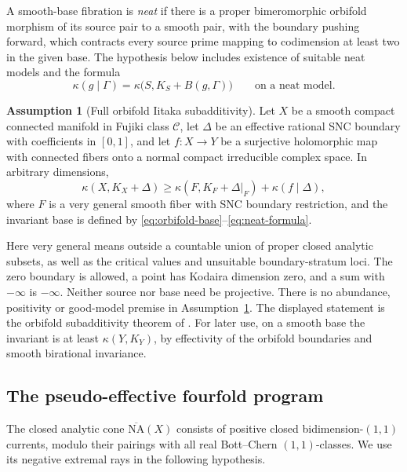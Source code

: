 \documentclass[11pt,letterpaper]{article}
\theoremstyle{definition}
\newtheorem{assumption}[theorem]{Assumption}
\theoremstyle{remark}
\begin{document}
A smooth-base fibration is \emph{neat} if there is a proper
bimeromorphic orbifold morphism of its source pair to a smooth pair,
with the boundary pushing forward, which contracts every source prime
mapping to codimension at least two in the given base. The hypothesis
below includes existence of suitable neat models and the formula
\begin{equation}\label{eq:neat-formula}
 \kappa(g\mid\Gamma)=\kappa\bigl(S,K_S+B(g,\Gamma)\bigr)
 \qquad\text{on a neat model}.
\end{equation}

\begin{assumption}[Full orbifold Iitaka subadditivity]
\label{hyp:campana}
Let \(X\) be a smooth compact connected manifold in Fujiki class
\(\mathcal C\), let \(\Delta\) be an effective rational SNC
boundary with coefficients in \([0,1]\), and let \(f:X\to Y\) be
a surjective holomorphic map with connected fibers onto a normal
compact irreducible complex space. In arbitrary dimensions,
\begin{equation}\label{eq:campana}
 \kappa(X,K_X+\Delta)\ge
 \kappa(F,K_F+\Delta|_F)+\kappa(f\mid\Delta),
\end{equation}
where \(F\) is a very general smooth fiber with SNC boundary
restriction, and the invariant base is defined by
\eqref{eq:orbifold-base}--\eqref{eq:neat-formula}.
\end{assumption}

Here very general means outside a countable union of proper closed
analytic subsets, as well as the critical values and unsuitable
boundary-stratum loci. The zero boundary is allowed, a point has
Kodaira dimension zero, and a sum with \(-\infty\) is
\(-\infty\). Neither source nor base need be projective. There is
no abundance, positivity or good-model premise in
Assumption~\ref{hyp:campana}. The displayed statement is the orbifold
subadditivity theorem of \cite[Theorem~1.1]{GrantCampana}. For later use,
on a smooth base the invariant
is at least \(\kappa(Y,K_Y)\), by effectivity of the orbifold
boundaries and smooth birational invariance.

\subsection{The pseudo-effective fourfold program}

The closed analytic cone \(\overline{\mathrm{NA}}(X)\) consists of positive closed
bidimension-\((1,1)\) currents, modulo their pairings with all real
Bott--Chern \((1,1)\)-classes. We use its negative extremal rays in
the following hypothesis.
\end{document}
